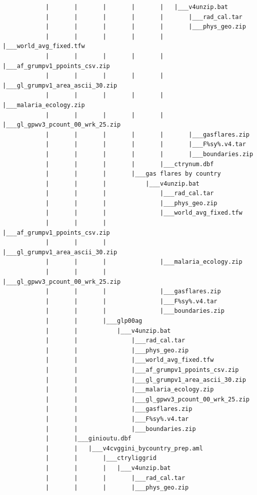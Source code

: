 \documentclass[
]{book}
\begin{document}
\begin{verbatim}
            |       |       |       |       |   |___v4unzip.bat
            |       |       |       |       |       |___rad_cal.tar
            |       |       |       |       |       |___phys_geo.zip
            |       |       |       |       |       |___world_avg_fixed.tfw
            |       |       |       |       |       |___af_grumpv1_ppoints_csv.zip
            |       |       |       |       |       |___gl_grumpv1_area_ascii_30.zip
            |       |       |       |       |       |___malaria_ecology.zip
            |       |       |       |       |       |___gl_gpwv3_pcount_00_wrk_25.zip
            |       |       |       |       |       |___gasflares.zip
            |       |       |       |       |       |___F%sy%.v4.tar
            |       |       |       |       |       |___boundaries.zip
            |       |       |       |       |___ctrynum.dbf
            |       |       |       |___gas flares by country
            |       |       |           |___v4unzip.bat
            |       |       |               |___rad_cal.tar
            |       |       |               |___phys_geo.zip
            |       |       |               |___world_avg_fixed.tfw
            |       |       |               |___af_grumpv1_ppoints_csv.zip
            |       |       |               |___gl_grumpv1_area_ascii_30.zip
            |       |       |               |___malaria_ecology.zip
            |       |       |               |___gl_gpwv3_pcount_00_wrk_25.zip
            |       |       |               |___gasflares.zip
            |       |       |               |___F%sy%.v4.tar
            |       |       |               |___boundaries.zip
            |       |       |___glp00ag
            |       |           |___v4unzip.bat
            |       |               |___rad_cal.tar
            |       |               |___phys_geo.zip
            |       |               |___world_avg_fixed.tfw
            |       |               |___af_grumpv1_ppoints_csv.zip
            |       |               |___gl_grumpv1_area_ascii_30.zip
            |       |               |___malaria_ecology.zip
            |       |               |___gl_gpwv3_pcount_00_wrk_25.zip
            |       |               |___gasflares.zip
            |       |               |___F%sy%.v4.tar
            |       |               |___boundaries.zip
            |       |___ginioutu.dbf
            |       |   |___v4cvggini_bycountry_prep.aml
            |       |       |___ctryliggrid
            |       |       |   |___v4unzip.bat
            |       |       |       |___rad_cal.tar
            |       |       |       |___phys_geo.zip

\end{verbatim}
\end{document}
